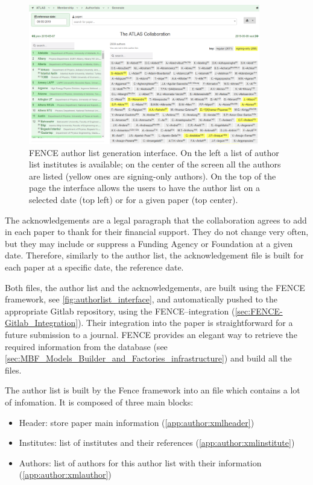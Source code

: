 \begin{figure}[htb]
  \centering
  \includegraphics[width=0.9\textwidth]{figures/authorlist_generation.png}
  \caption{FENCE author list generation interface. On the left a list of author list institutes is available; on the center of the screen all the authors are listed (yellow ones are signing-only  authors). On the top of the page the interface allows the users to have the author list on a selected date (top left) or for a given paper (top center).}%
  \label{fig:authorlist_generation}
\end{figure}

The acknowledgements are a legal paragraph that the collaboration agrees to add in each paper to thank for their financial support.
They do not change very often, but they may include or suppress a Funding Agency or Foundation at a given date.
Therefore, similarly to the author list, the acknowledgement file is built for each paper at a specific date, the reference date.

Both files, the author list and the acknowledgements, are built using the FENCE framework, see \cref{fig:authorlist_interface},
and automatically pushed to the appropriate Gitlab repository, using the FENCE--\gitlab integration (\cref{sec:FENCE-Gitlab_Integration}).
Their integration into the paper is straightforward for a future submission to a journal.
FENCE provides an elegant way to retrieve the required information from the database (see \cref{sec:MBF_Models_Builder_and_Factories_infrastructure}) and build all the files.

The author list is built by the Fence framework into an  file which contains a lot of infomation. It is composed of three main blocks:
\begin{itemize}
\item Header: store paper main information (\cref{app:author:xmlheader})
\item Institutes: list of institutes and their references (\cref{app:author:xmlinstitute})
\item Authors: list of authors for this author list with their information (\cref{app:author:xmlauthor})
\end{itemize}

